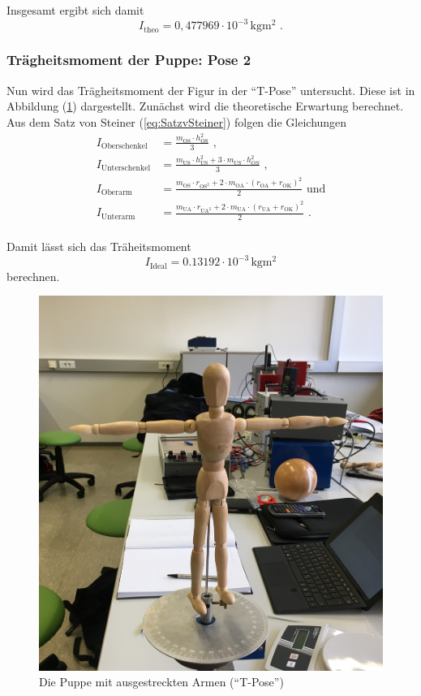 Insgesamt ergibt sich damit
\begin{equation*}
  I_{\text{theo}} = 0,477969 \cdot 10^{-3} \, \unit{\kilo\gram\meter\squared} \text{ .}
\end{equation*}

\subsubsection{Trägheitsmoment der Puppe: Pose 2}

Nun wird das Trägheitsmoment der Figur in der \enquote{T-Pose} untersucht.
Diese ist in Abbildung (\ref{fig:pose2}) dargestellt.
Zunächst wird die theoretische Erwartung berechnet.
Aus dem Satz von Steiner (\ref{eq:SatzvSteiner}) folgen die Gleichungen
\begin{align*}
I_{\text{Oberschenkel}} &= \frac{m_{\text{OS}} \cdot h_{\text{OS}}^2} {3} \text{ ,}\\
I_{\text{Unterschenkel}} &= \frac{m_{\text{US}} \cdot h_{\text{US}}^2 + 3 \cdot m_{US} \cdot h_{OS}^2} {3} \text{ ,}\\
I_{\text{Oberarm}} &= \frac{m_{\text{OS}} \cdot r_{\text{OS}^2} + 2 \cdot m_{\text{OA}} \cdot (r_{\text{OA}} + r_{\text{OK}})^2} {2} \text{ und}\\
I_{\text{Unterarm}} &= \frac{m_{\text{UA}} \cdot r_{\text{UA}^2} + 2 \cdot m_{\text{UA}} \cdot (r_{\text{UA}} + r_{\text{OK}})^2} {2} \text{ .}\\
\end{align*}

Damit lässt sich das Träheitsmoment
\begin{equation*}
  I_{\text{Ideal}} = 0.13192 \cdot 10^{-3} \, \unit{\kilo\gram\meter\squared}
\end{equation*}
berechnen.

\begin{figure}[H]
  \centering
  \includegraphics[width=0.3\columnwidth]{pictures/puppe_tpose.jpg}
  \caption{Die Puppe mit ausgestreckten Armen (\enquote{T-Pose})}
  \label{fig:pose2}
\end{figure}

